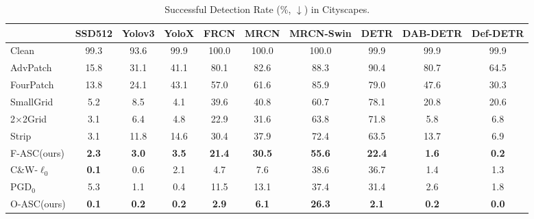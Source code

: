 \documentclass[times,twocolumn,final,authoryear]{elsarticle}
\begin{document}
\begin{table*}[!h]
\centering
\caption{Successful Detection Rate (\%, $\downarrow$) in Cityscapes. 
}
\begin{tabular}{l|ccccccccc}
\hline
               & SSD512 & Yolov3 & YoloX & FRCN  & MRCN  & MRCN-Swin & DETR & DAB-DETR & Def-DETR \\ \hline
Clean          & 99.3   & 93.6   & 99.9  & 100.0 & 100.0 & 100.0     & 99.9 & 99.9     & 99.9     \\ \hline
AdvPatch       & 15.8   & 31.1   & 41.1  & 80.1  & 82.6  & 88.3      & 90.4 & 80.7     & 64.5     \\
FourPatch      & 13.8   & 24.1   & 43.1  & 57.0  & 61.6  & 85.9      & 79.0 & 47.6     & 30.3     \\
SmallGrid      & 5.2    & 8.5    & 4.1   & 39.6  & 40.8  & 60.7      & 78.1 & 20.8     & 20.6     \\
2$\times$2Grid & 3.1    & 6.4    & 4.8   & 22.9  & 31.6  & 63.8      & 71.8 & 5.8      & 6.8      \\
Strip          & 3.1    & 11.8   & 14.6  & 30.4  & 37.9  & 72.4      & 63.5 & 13.7     & 6.9      \\
F-ASC(ours)    & \textbf{2.3}    & \textbf{3.0}    & \textbf{3.5}   & \textbf{21.4}  & \textbf{30.5}  & \textbf{55.6}      & \textbf{22.4} & \textbf{1.6}      & \textbf{0.2}      \\ \hline
C\&W-$\ell_0$  & \textbf{0.1}    & 0.6    & 2.1   & 4.7   & 7.6   & 38.6      & 36.7 & 1.4      & 1.3      \\
PGD$_0$        & 5.3    & 1.1    & 0.4   & 11.5  & 13.1  & 37.4      & 31.4 & 2.6      & 1.8      \\
O-ASC(ours)    & \textbf{0.1}    & \textbf{0.2}    & \textbf{0.2}   & \textbf{2.9}   & \textbf{6.1}   & \textbf{26.3}      & \textbf{2.1}  & \textbf{0.2}      & \textbf{0.0}      \\ \hline
\end{tabular}
\label{tab:cityscapes}
\end{table*}
\end{document}
